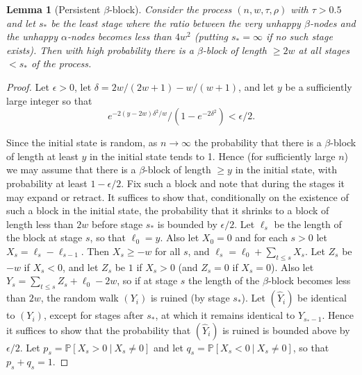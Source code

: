 \documentclass[11pt]{article}
\theoremstyle{plain}
\newtheorem{lem}[thm]{Lemma}
\numberwithin{equation}{subsection}
\DeclareRobustCommand{\probac}[3][{\mbox{$\mathbb{P}$}}]{\ensuremath {#1}[ {#2} \ |\  {#3} ]}
\begin{document}
\begin{lem}[Persistent \texorpdfstring{$\beta$}{beta}-block]\label{le:persistb1}
Consider the process
$(n,w,\tau,\rho)$ with $\tau>0.5$  
and let $s_{\ast}$ be the least stage where
the ratio between the very unhappy $\beta$-nodes and the unhappy $\alpha$-nodes
becomes less than $4w^2$ (putting $s_{\ast}=\infty$ if no such stage exists). Then with 
high probability there is a $\beta$-block of length $\geq 2w$ at all
stages $<s_{\ast}$ of the process. 
\end{lem}
\begin{proof}
Let $\epsilon>0$,
let $\delta= 2w/(2w+1)-w/(w+1)$,
and let $y$ be a sufficiently large integer so that
\begin{equation}\label{eq:eqforproai}
e^{-2(y-2w)\delta^2/w}/(1-e^{-2\delta^2})<\epsilon/2.
\end{equation}

Since the initial state is random, as $n\to\infty$ 
the probability that
there is a $\beta$-block of length at least $y$ 
in the initial state tends to 1.
Hence (for sufficiently large $n$) we may assume that
there is a  $\beta$-block of length $\geq y$ 
in the initial state, with probability at least $1-\epsilon/2$.
Fix such a block and note that during the stages it may expand or
retract. It suffices to show that, conditionally on the existence of such a block in the
initial state, the probability
that it shrinks to a block of length less than $2w$ before stage $s_{\ast}$
is bounded by $\epsilon/2$.
Let $\ell_s$ be the length of the block at stage $s$, so that
$\ell_0= y$.
Also let $X_0=0$ and for each $s>0$ let 
$X_s=\ell_s-\ell_{s-1}$. Then $X_s\geq -w$ for all $s$,
and  $\ell_s=\ell_0+\sum_{t\leq s} X_s$.
 Let $Z_s$ be $-w$ if $X_s<0$, and let
 $Z_s$ be $1$ if $X_s>0$ (and $Z_s=0$ if $X_s=0$).
 Also let $Y_s=\sum_{t\leq s} Z_s +\ell_0-2w$, so
if at stage $s$ the length of the $\beta$-block becomes less than $2w$,
the random walk $(Y_i)$ is ruined (by stage $s_{\ast}$). Let 
$(\hat{Y}_i)$ be identical to $(Y_i)$, except for stages after $s_{\ast}$, at which
it remains identical to $Y_{s_{\ast}-1}$.  
Hence it suffices to show that the probability that 
$(\hat{Y}_i)$ is ruined is bounded above by $\epsilon/2$. 
 Let $p_s=\probac{X_s>0}{X_s\neq 0}$ and 
 let $q_s=\probac{X_s<0}{X_s\neq 0}$, so that $p_s+q_s=1$.


\end{proof}
\end{document}
